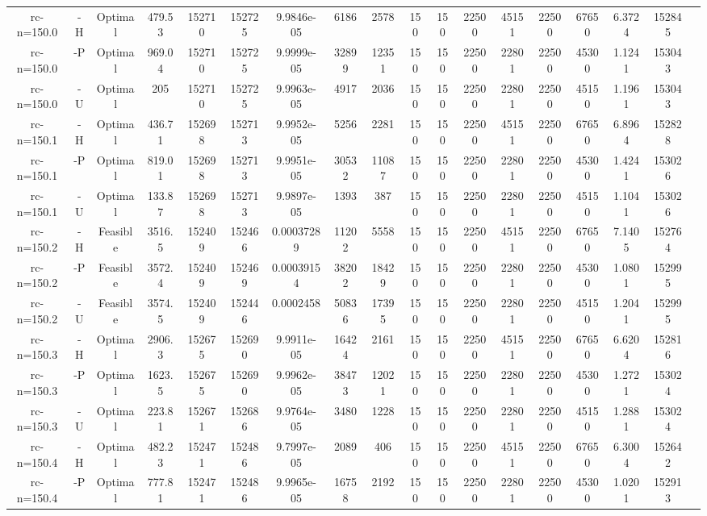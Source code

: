 \documentclass[landscape, a4paper]{article}
\begin{document}
\begin{center}
\begin{tabular}{@{}cccccccccccccccccc@{}}
rc-n=150.0 & -H & Optimal & 479.53 & 152710 & 152725 & 9.9846e-05 & 6186 & 2578 & 150 & 150 & 22500 & 45151 & 22500 & 67650 & 6.3724 & 152845 & \\
rc-n=150.0 & -P & Optimal & 969.04 & 152710 & 152725 & 9.9999e-05 & 32899 & 12351 & 150 & 150 & 22500 & 22801 & 22500 & 45300 & 1.1241 & 153043 & \\
rc-n=150.0 & -U & Optimal & 205 & 152710 & 152725 & 9.9963e-05 & 4917 & 2036 & 150 & 150 & 22500 & 22801 & 22500 & 45150 & 1.1961 & 153043 & \\
rc-n=150.1 & -H & Optimal & 436.71 & 152698 & 152713 & 9.9952e-05 & 5256 & 2281 & 150 & 150 & 22500 & 45151 & 22500 & 67650 & 6.8964 & 152828 & \\
rc-n=150.1 & -P & Optimal & 819.01 & 152698 & 152713 & 9.9951e-05 & 30532 & 11087 & 150 & 150 & 22500 & 22801 & 22500 & 45300 & 1.4241 & 153026 & \\
rc-n=150.1 & -U & Optimal & 133.87 & 152698 & 152713 & 9.9897e-05 & 1393 & 387 & 150 & 150 & 22500 & 22801 & 22500 & 45150 & 1.1041 & 153026 & \\
rc-n=150.2 & -H & Feasible & 3516.5 & 152409 & 152466 & 0.00037289 & 11202 & 5558 & 150 & 150 & 22500 & 45151 & 22500 & 67650 & 7.1405 & 152764 & \\
rc-n=150.2 & -P & Feasible & 3572.4 & 152409 & 152469 & 0.00039154 & 38202 & 18429 & 150 & 150 & 22500 & 22801 & 22500 & 45300 & 1.0801 & 152995 & \\
rc-n=150.2 & -U & Feasible & 3574.5 & 152409 & 152446 & 0.0002458 & 50836 & 17395 & 150 & 150 & 22500 & 22801 & 22500 & 45150 & 1.2041 & 152995 & \\
rc-n=150.3 & -H & Optimal & 2906.3 & 152675 & 152690 & 9.9911e-05 & 16424 & 2161 & 150 & 150 & 22500 & 45151 & 22500 & 67650 & 6.6204 & 152816 & \\
rc-n=150.3 & -P & Optimal & 1623.5 & 152675 & 152690 & 9.9962e-05 & 38473 & 12021 & 150 & 150 & 22500 & 22801 & 22500 & 45300 & 1.2721 & 153024 & \\
rc-n=150.3 & -U & Optimal & 223.81 & 152671 & 152686 & 9.9764e-05 & 3480 & 1228 & 150 & 150 & 22500 & 22801 & 22500 & 45150 & 1.2881 & 153024 & \\
rc-n=150.4 & -H & Optimal & 482.23 & 152471 & 152486 & 9.7997e-05 & 2089 & 406 & 150 & 150 & 22500 & 45151 & 22500 & 67650 & 6.3004 & 152642 & \\
rc-n=150.4 & -P & Optimal & 777.81 & 152471 & 152486 & 9.9965e-05 & 16758 & 2192 & 150 & 150 & 22500 & 22801 & 22500 & 45300 & 1.0201 & 152913 & \\

\end{tabular}
\end{center}
\end{document}
